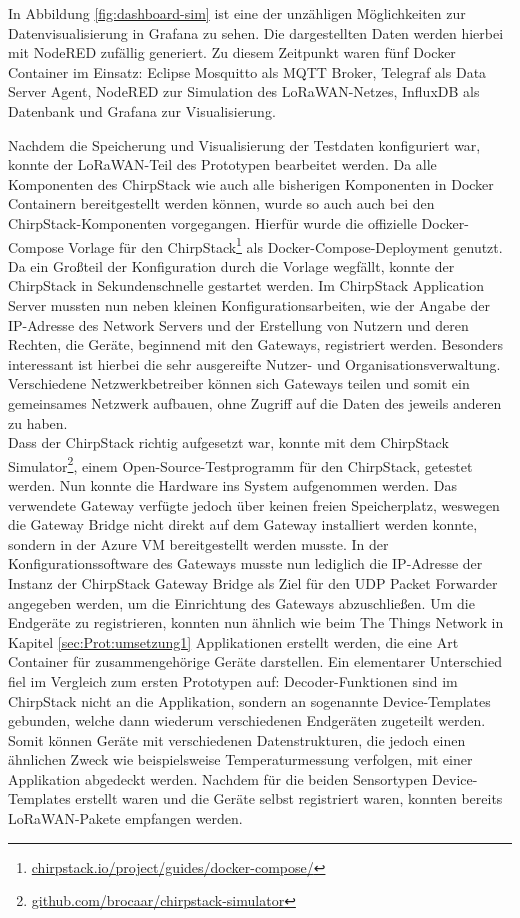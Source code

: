 In Abbildung \ref{fig:dashboard-sim} ist eine der unzähligen Möglichkeiten zur Datenvisualisierung in Grafana zu sehen. Die dargestellten Daten werden hierbei mit NodeRED zufällig generiert. Zu diesem Zeitpunkt waren fünf Docker Container im Einsatz: Eclipse Mosquitto als MQTT Broker, Telegraf als Data Server Agent, NodeRED zur Simulation des LoRaWAN-Netzes, InfluxDB als Datenbank und Grafana zur Visualisierung.

Nachdem die Speicherung und Visualisierung der Testdaten konfiguriert war, konnte der LoRaWAN-Teil des Prototypen bearbeitet werden. Da alle Komponenten des ChirpStack wie auch alle bisherigen Komponenten in Docker Containern bereitgestellt werden können, wurde so auch auch bei den ChirpStack-Komponenten vorgegangen. Hierfür wurde die offizielle Docker-Compose Vorlage für den ChirpStack\footnote{\url{chirpstack.io/project/guides/docker-compose/}} als Docker-Compose-Deployment genutzt. Da ein Großteil der Konfiguration durch die Vorlage wegfällt, konnte der ChirpStack in Sekundenschnelle gestartet werden. Im ChirpStack Application Server mussten nun neben kleinen Konfigurationsarbeiten, wie der Angabe der IP-Adresse des Network Servers und der Erstellung von Nutzern und deren Rechten, die Geräte, beginnend mit den Gateways, registriert werden. Besonders interessant ist hierbei die sehr ausgereifte Nutzer- und Organisationsverwaltung. Verschiedene Netzwerkbetreiber können sich Gateways teilen und somit ein gemeinsames Netzwerk aufbauen, ohne Zugriff auf die Daten des jeweils anderen zu haben.\\
Dass der ChirpStack richtig aufgesetzt war, konnte mit dem ChirpStack Simulator\footnote{\url{github.com/brocaar/chirpstack-simulator}}, einem Open-Source-Testprogramm für den ChirpStack, getestet werden. Nun konnte die Hardware ins System aufgenommen werden. Das verwendete Gateway verfügte jedoch über keinen freien Speicherplatz, weswegen die Gateway Bridge nicht direkt auf dem Gateway installiert werden konnte, sondern in der Azure VM bereitgestellt werden musste. In der Konfigurationssoftware des Gateways musste nun lediglich die IP-Adresse der Instanz der ChirpStack Gateway Bridge als Ziel für den UDP Packet Forwarder angegeben werden, um die Einrichtung des Gateways abzuschließen. Um die Endgeräte zu registrieren, konnten nun ähnlich wie beim The Things Network in Kapitel \ref{sec:Prot:umsetzung1} Applikationen erstellt werden, die eine Art Container für zusammengehörige Geräte darstellen. Ein elementarer Unterschied fiel im Vergleich zum ersten Prototypen auf: Decoder-Funktionen sind im ChirpStack nicht an die Applikation, sondern an sogenannte Device-Templates gebunden, welche dann wiederum verschiedenen Endgeräten zugeteilt werden. Somit können Geräte mit verschiedenen Datenstrukturen, die jedoch einen ähnlichen Zweck wie beispielsweise Temperaturmessung verfolgen, mit einer Applikation abgedeckt werden. Nachdem für die beiden Sensortypen Device-Templates erstellt waren und die Geräte selbst registriert waren, konnten bereits LoRaWAN-Pakete empfangen werden. 

